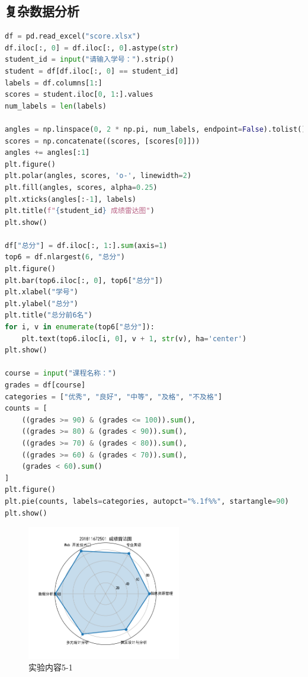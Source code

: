 \documentclass{article}
\begin{document}
\subsection{复杂数据分析}

\begin{lstlisting}[language=Python]
df = pd.read_excel("score.xlsx")
df.iloc[:, 0] = df.iloc[:, 0].astype(str)
student_id = input("请输入学号：").strip()
student = df[df.iloc[:, 0] == student_id]
labels = df.columns[1:]
scores = student.iloc[0, 1:].values
num_labels = len(labels)

angles = np.linspace(0, 2 * np.pi, num_labels, endpoint=False).tolist()
scores = np.concatenate((scores, [scores[0]]))
angles += angles[:1]
plt.figure()
plt.polar(angles, scores, 'o-', linewidth=2)
plt.fill(angles, scores, alpha=0.25)
plt.xticks(angles[:-1], labels)
plt.title(f"{student_id} 成绩雷达图")
plt.show()

df["总分"] = df.iloc[:, 1:].sum(axis=1)
top6 = df.nlargest(6, "总分")
plt.figure()
plt.bar(top6.iloc[:, 0], top6["总分"])
plt.xlabel("学号")
plt.ylabel("总分")
plt.title("总分前6名")
for i, v in enumerate(top6["总分"]):
    plt.text(top6.iloc[i, 0], v + 1, str(v), ha='center')
plt.show()

course = input("课程名称：")
grades = df[course]
categories = ["优秀", "良好", "中等", "及格", "不及格"]
counts = [
    ((grades >= 90) & (grades <= 100)).sum(),
    ((grades >= 80) & (grades < 90)).sum(),
    ((grades >= 70) & (grades < 80)).sum(),
    ((grades >= 60) & (grades < 70)).sum(),
    (grades < 60).sum()
]
plt.figure()
plt.pie(counts, labels=categories, autopct="%.1f%%", startangle=90)
plt.show()
\end{lstlisting}

\begin{figure}[H]
  \centering
  \includegraphics[width=0.6\textwidth]{Figure_0.png}
  \caption{实验内容5-1}
\end{figure}
\end{document}
